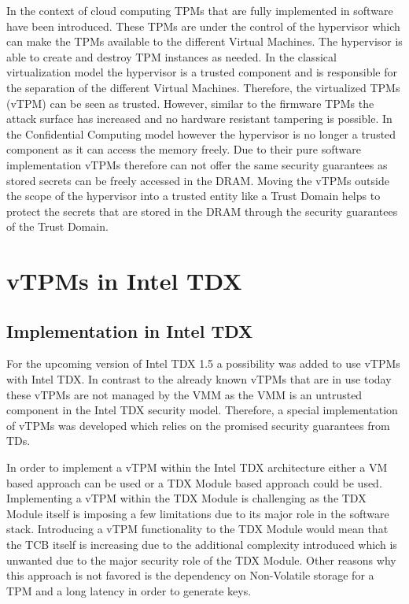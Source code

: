 \documentclass[sigplan,screen,nonacm]{acmart}
\begin{document}
In the context of cloud computing TPMs that are fully implemented in software have been introduced.
These TPMs are under the control of the hypervisor which can make the TPMs available to the different Virtual Machines.
The hypervisor is able to create and destroy TPM instances as needed.
In the classical virtualization model the hypervisor is a trusted component and is responsible for the separation of the different Virtual Machines.
Therefore, the virtualized TPMs (vTPM) can be seen as trusted.
However, similar to the firmware TPMs the attack surface has increased and no hardware resistant tampering is possible\cite{perez2006vtpm}\cite{vTPM-google}.
In the Confidential Computing model however the hypervisor is no longer a trusted component as it can access the memory freely.
Due to their pure software implementation vTPMs therefore can not offer the same security guarantees as stored secrets can be freely accessed in the DRAM.
Moving the vTPMs outside the scope of the hypervisor into a trusted entity like a Trust Domain helps to protect the secrets that are stored in the DRAM through the security guarantees of the Trust Domain.

\section{vTPMs in Intel TDX}
\label{chap:vTPMTDX}

\subsection{Implementation in Intel TDX}
For the upcoming version of Intel TDX 1.5 a possibility was added to use vTPMs with Intel TDX.
In contrast to the already known vTPMs that are in use today these vTPMs are not managed by the VMM as the VMM is an untrusted component in the Intel TDX security model.
Therefore, a special implementation of vTPMs was developed which relies on the promised security guarantees from TDs.

In order to implement a vTPM within the Intel TDX architecture either a VM based approach can be used or a TDX Module based approach could be used.
Implementing a vTPM within the TDX Module is challenging as the TDX Module itself is imposing a few limitations due to its major role in the software stack.
Introducing a vTPM functionality to the TDX Module would mean that the TCB itself is increasing due to the additional complexity introduced which is unwanted due to the major security role of the TDX Module\cite[p. 4]{Intel-vTPM}.
Other reasons why this approach is not favored is the dependency on Non-Volatile storage for a TPM and a long latency in order to generate keys\cite[p. 4]{Intel-vTPM}.
\end{document}
